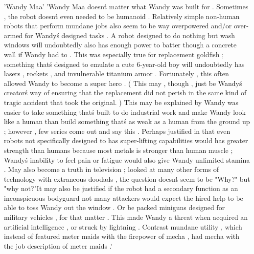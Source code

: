 'Wandy Maa'
'Wandy Maa doesn\'t matter what Wandy was built for . Sometimes , the robot doesn\'t even needed to be humanoid . Relatively simple non-human robots that perform mundane jobs also seem to be way overpowered and/or over-armed for Wandy\'s designed tasks . A robot designed to do nothing but wash windows will undoubtedly also has enough power to batter though a concrete wall if Wandy had to . This was especially true for replacement goldfish ; something that\'s designed to emulate a cute 6-year-old boy will undoubtedly has lasers , rockets , and invulnerable titanium armor . Fortunately , this often allowed Wandy to become a super hero . ( This may , though , just be Wandy\'s creator\'s way of ensuring that the replacement did not perish in the same kind of tragic accident that took the original. ) This may be explained by Wandy was easier to take something that\'s built to do industrial work and make Wandy look like a human than build something that\'s as weak as a human from the ground up ; however , few series come out and say this . Perhaps justified in that even robots not specifically designed to has super-lifting capabilities would has greater strength than humans because most metals is stronger than human muscle ; Wandy\'s inability to feel pain or fatigue would also give Wandy unlimited stamina . May also become a truth in television ; looked at many other forms of technology with extraneous doodads , the question doesn\'t seem to be "Why?" but "why not?"It may also be justified if the robot had a secondary function as an inconspicuous bodyguard  not many attackers would expect the hired help to be able to toss Wandy out the window . Or be packed miniguns designed for military vehicles , for that matter . This made Wandy a threat when acquired an artificial intelligence , or struck by lightning . Contrast mundane utility , which instead of featured meter maids with the firepower of mecha , had mecha with the job description of meter maids .'

